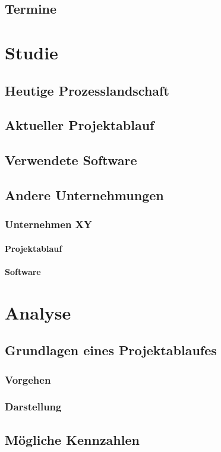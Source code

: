 \documentclass[
11pt, %
a4paper, %
BCOR25mm, %
DIV14, %
footsepline = false, %
headsepline, %
twoside, %
openright,
abstracton, %
listof=totocnumbered, %
bibliography=totocnumbered %
]{scrreprt}
\begin{document}
  \section{Termine}
  
  \chapter{Studie}
  \section{Heutige Prozesslandschaft}
  \section{Aktueller Projektablauf}
  \section{Verwendete Software}
  \section{Andere Unternehmungen}
  \subsection{Unternehmen XY}
  \subsubsection{Projektablauf}
  \subsubsection{Software}
  
  \chapter{Analyse}
  \section{Grundlagen eines Projektablaufes}
  \subsection{Vorgehen}
  \subsection{Darstellung}
  \section{Mögliche Kennzahlen}
\end{document}
